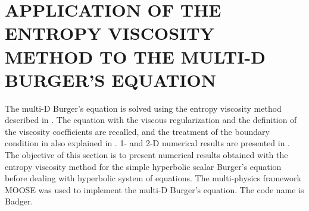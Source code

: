 %
%
%

\chapter{\uppercase {Application of the entropy viscosity method to the multi-D Burger's equation}}\label{chap:burger_chap3}
The multi-D Burger's equation is solved using the entropy viscosity method described in . The equation with the viscous regularization and the definition of the viscosity coefficients are recalled, and the treatment of the boundary condition in also explained in . 1- and 2-D numerical results are presented in . The objective of this section is to present numerical results obtained with the entropy viscosity method for the simple hyperbolic scalar Burger's equation before dealing with hyperbolic system of equations. The multi-physics framework MOOSE \cite{Moose} was used to implement the multi-D Burger's equation. The code name is Badger.
%
